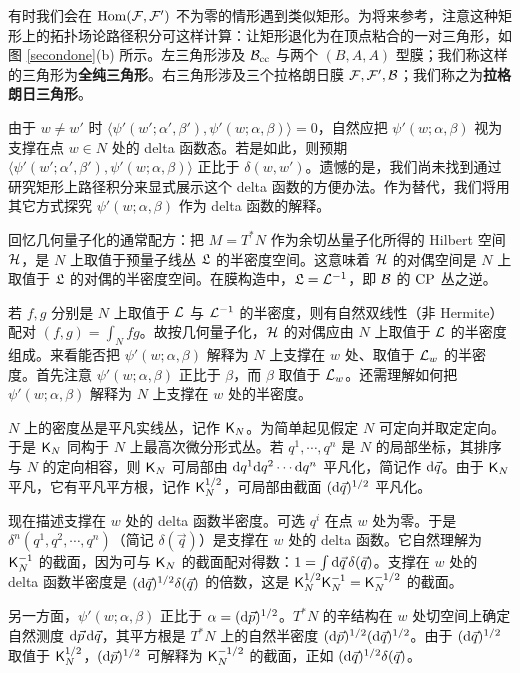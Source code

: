 有时我们会在 ${\mathrm{Hom}}({\mathcal F},{\mathcal F}')$ 不为零的情形遇到类似矩形。为将来参考，注意这种矩形上的拓扑场论路径积分可这样计算：让矩形退化为在顶点粘合的一对三角形，如图 \ref{secondone}(b) 所示。左三角形涉及 ${\mathcal B}_{\mathrm{cc}}$ 与两个 $(B,A,A)$ 型膜；我们称这样的三角形为\textbf{全纯三角形}。右三角形涉及三个拉格朗日膜 ${\mathcal F},{\mathcal F}',{\mathcal B}$；我们称之为\textbf{拉格朗日三角形}。

由于 $w\ne w'$ 时 $\langle\psi'(w';\alpha',\beta'),\psi'(w;\alpha,\beta)\rangle=0$，自然应把 $\psi'(w;\alpha,\beta)$ 视为支撑在点 $w\in N$ 处的 delta 函数态。若是如此，则预期 $\langle\psi'(w';\alpha',\beta'),\psi'(w;\alpha,\beta)\rangle$ 正比于 $\delta(w,w')$。遗憾的是，我们尚未找到通过研究矩形上路径积分来显式展示这个 delta 函数的方便办法。作为替代，我们将用其它方式探究 $\psi'(w;\alpha,\beta)$ 作为 delta 函数的解释。

回忆几何量子化的通常配方：把 $M=T^*N$ 作为余切丛量子化所得的 Hilbert 空间 ${\mathcal H}$，是 $N$ 上取值于预量子线丛 ${\mathfrak L}$ 的半密度空间。这意味着 ${\mathcal H}$ 的对偶空间是 $N$ 上取值于 ${\mathfrak L}$ 的对偶的半密度空间。在膜构造中，${\mathfrak L}={\mathcal L}^{-1}$，即 ${\mathcal B}$ 的 ${\mathrm{CP}}$ 丛之逆。

若 $f,g$ 分别是 $N$ 上取值于 ${\mathcal L}$ 与 ${\mathcal L}^{-1}$ 的半密度，则有自然双线性（非 Hermite）配对 $(f,g)=\int_Nfg$。故按几何量子化，${\mathcal H}$ 的对偶应由 $N$ 上取值于 ${\mathcal L}$ 的半密度组成。来看能否把 $\psi'(w;\alpha,\beta)$ 解释为 $N$ 上支撑在 $w$ 处、取值于 ${\mathcal L}_w$ 的半密度。首先注意 $\psi'(w;\alpha,\beta)$ 正比于 $\beta$，而 $\beta$ 取值于 ${\mathcal L}_w$。还需理解如何把 $\psi'(w;\alpha,\beta)$ 解释为 $N$ 上支撑在 $w$ 处的半密度。

$N$ 上的密度丛是平凡实线丛，记作 ${\sf K}_N$。为简单起见假定 $N$ 可定向并取定定向。于是 ${\sf K}_N$ 同构于 $N$ 上最高次微分形式丛。若 $q^1,\cdots,q^n$ 是 $N$ 的局部坐标，其排序与 $N$ 的定向相容，则 ${\sf K}_N$ 可局部由 ${\mathrm d} q^1{\mathrm d} q^2\cdots{\mathrm d} q^n$ 平凡化，简记作 ${\mathrm d}\vec q$。由于 ${\sf K}_N$ 平凡，它有平凡平方根，记作 ${\sf K}_N^{1/2}$，可局部由截面 $({\mathrm d}\vec q)^{1/2}$ 平凡化。

现在描述支撑在 $w$ 处的 delta 函数半密度。可选 $q^i$ 在点 $w$ 处为零。于是 $\delta^n(q^1,q^2,\cdots,q^n)$（简记 $\delta(\vec q)$）是支撑在 $w$ 处的 delta 函数。它自然理解为 ${\sf K}_N^{-1}$ 的截面，因为可与 ${\sf K}_N$ 的截面配对得数：$1=\int{\mathrm d}\vec q\,\delta(\vec q)$。支撑在 $w$ 处的 delta 函数半密度是 $({\mathrm d}\vec q)^{1/2}\delta(\vec q)$ 的倍数，这是 ${\sf K}_N^{1/2}{\sf K}_N^{-1}={\sf K}_N^{-1/2}$ 的截面。

另一方面，$\psi'(w;\alpha,\beta)$ 正比于 $\alpha=({\mathrm d}\vec p)^{1/2}$。$T^*N$ 的辛结构在 $w$ 处切空间上确定自然测度 ${\mathrm d}\vec p\,{\mathrm d}\vec q$，其平方根是 $T^*N$ 上的自然半密度 $({\mathrm d}\vec p)^{1/2}({\mathrm d}\vec q)^{1/2}$。由于 $({\mathrm d}\vec q)^{1/2}$ 取值于 ${\sf K}_N^{1/2}$，$({\mathrm d}\vec p)^{1/2}$ 可解释为 ${\sf K}_N^{-1/2}$ 的截面，正如 $({\mathrm d}\vec q)^{1/2}\delta(\vec q)$。

